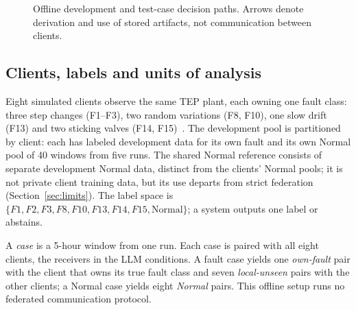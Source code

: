 \documentclass[conference]{IEEEtran}
\newcommand{\TEP}{TEP}
\newcommand{\PROTO}{\textsc{proto}}
\newcommand{\cond}[1]{\textsf{#1}}
\newcommand{\lu}{local-unseen}
\begin{document}
\begin{figure}[t]
\caption{Offline development and test-case decision paths. Arrows denote derivation and use of stored artifacts, not communication between clients.}
\label{fig:method-flow}
\end{figure}

\subsection{Clients, labels and units of analysis}
Eight simulated clients observe the same \TEP{} plant, each owning one fault class: three step changes (F1--F3), two random variations (F8, F10), one slow drift (F13) and two sticking valves (F14, F15)~\cite{downs1993tep}. The development pool is partitioned by client: each has labeled development data for its own fault and its own Normal pool of 40 windows from five runs. The shared Normal reference consists of separate development Normal data, distinct from the clients' Normal pools; it is not private client training data, but its use departs from strict federation (Section~\ref{sec:limits}). The label space is $\{F1,F2,F3,F8,F10,F13,F14,F15,\text{Normal}\}$; a system outputs one label or abstains.

A \emph{case} is a 5-hour window from one run. Each case is paired with all eight clients, the receivers in the LLM conditions. A fault case yields one \emph{own-fault} pair with the client that owns its true fault class and seven \emph{\lu} pairs with the other clients; a Normal case yields eight \emph{Normal} pairs. This offline setup runs no federated communication protocol.
\end{document}
